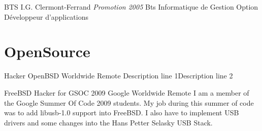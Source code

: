 \documentclass[11pt,a4paper,sans]{moderncv}
\begin{document}
{BTS}
{I.G.}
{Clermont-Ferrand}
{\textit{Promotion 2005}}
{Bts Informatique de Gestion Option D\'{e}veloppeur d'applications}

\section{OpenSource}

{Hacker}
{OpenBSD}
{Worldwide Remote}
{}
{Description line 1\newline{}Description line 2}

{FreeBSD Hacker for GSOC 2009}
{Google}
{Worldwide Remote}
{}
{I am a member of the Google Summer Of Code 2009 students. My job during this
summer of code was to add libusb-1.0 support into FreeBSD. I also have to
implement USB drivers and some changes into the Hans Petter Selasky USB Stack.
}
\end{document}
